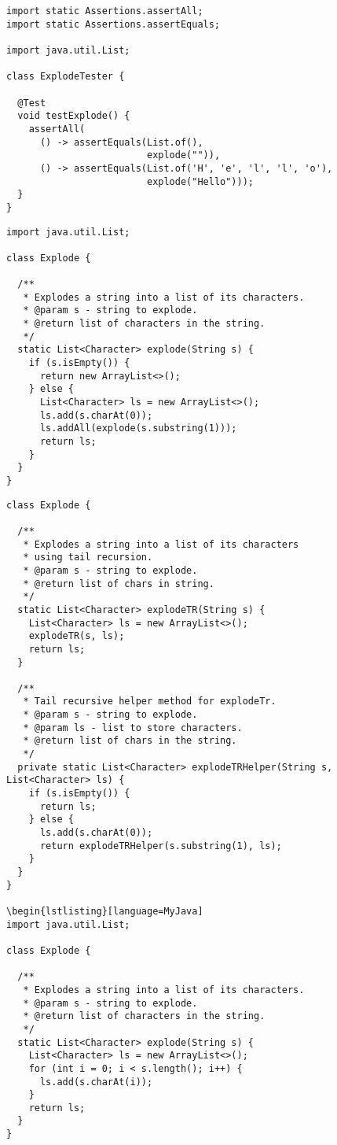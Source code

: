 \begin{lstlisting}[language=MyJava]
import static Assertions.assertAll;
import static Assertions.assertEquals;

import java.util.List;

class ExplodeTester {
  
  @Test
  void testExplode() {
    assertAll(
      () -> assertEquals(List.of(),
                         explode("")),
      () -> assertEquals(List.of('H', 'e', 'l', 'l', 'o'),
                         explode("Hello")));
  }
}
\end{lstlisting}

\begin{lstlisting}[language=MyJava]
import java.util.List;

class Explode {

  /**
   * Explodes a string into a list of its characters.
   * @param s - string to explode.
   * @return list of characters in the string.
   */
  static List<Character> explode(String s) {
    if (s.isEmpty()) { 
      return new ArrayList<>();
    } else {
      List<Character> ls = new ArrayList<>();
      ls.add(s.charAt(0));
      ls.addAll(explode(s.substring(1)));
      return ls;
    }
  }
}
\end{lstlisting}

\begin{lstlisting}[language=MyJava]
class Explode {
  
  /**
   * Explodes a string into a list of its characters
   * using tail recursion.
   * @param s - string to explode.
   * @return list of chars in string.
   */
  static List<Character> explodeTR(String s) {
    List<Character> ls = new ArrayList<>();
    explodeTR(s, ls);
    return ls;
  }

  /**
   * Tail recursive helper method for explodeTr.
   * @param s - string to explode.
   * @param ls - list to store characters.
   * @return list of chars in the string.
   */
  private static List<Character> explodeTRHelper(String s, List<Character> ls) {
    if (s.isEmpty()) { 
      return ls; 
    } else {
      ls.add(s.charAt(0));
      return explodeTRHelper(s.substring(1), ls);
    }
  }
}

\begin{lstlisting}[language=MyJava]
import java.util.List;

class Explode {

  /**
   * Explodes a string into a list of its characters.
   * @param s - string to explode.
   * @return list of characters in the string.
   */
  static List<Character> explode(String s) {
    List<Character> ls = new ArrayList<>();
    for (int i = 0; i < s.length(); i++) {
      ls.add(s.charAt(i));
    }
    return ls;
  }
}
\end{lstlisting}

